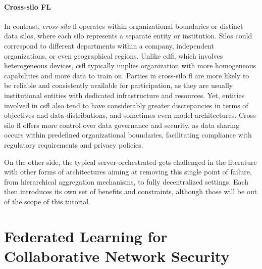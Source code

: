 \documentclass[conference]{IEEEtran}
\begin{document}
\paragraph*{Cross-silo FL} In contrast, \emph{cross-silo} \gls{fl} operates within organizational boundaries or distinct data silos, where each silo represents a separate entity or institution.
Silos could correspond to different departments within a company, independent organizations, or even geographical regions.
Unlike \gls{cdfl}, which involves heterogeneous devices, \gls{csfl} typically implies organization with more homogeneous capabilities and more data to train on.
Parties in cross-silo \gls{fl} are more likely to be reliable and consistently available for participation, as they are usually institutional entities with dedicated infrastructure and resources.
Yet, entities involved in \gls{csfl} also tend to have considerably greater discrepancies in terms of objectives and data-distributions, and sometimes even model architectures.
Cross-silo \gls{fl} offers more control over data governance and security, as data sharing occurs within predefined organizational boundaries, facilitating compliance with regulatory requirements and privacy policies.

On the other side, the typical server-orchestrated gets challenged in the literature with other forms of architectures aiming at removing this single point of failure, from hierarchical aggregation mechanisms, to fully decentralized settings.
Each then introduces its own set of benefits and constraints, although those will be out of the scope of this tutorial.




\section{Federated Learning for Collaborative Network Security} %
\label{sec:fids}
\end{document}
